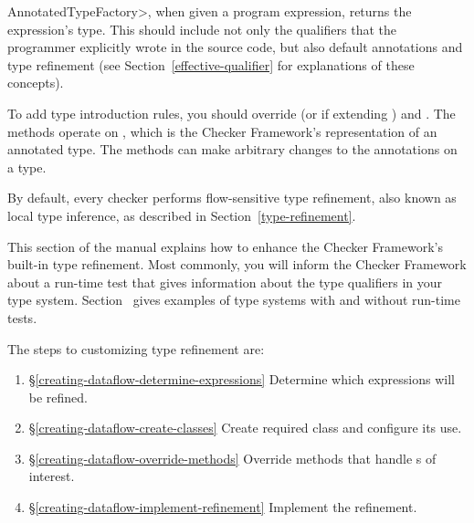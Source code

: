 \<AnnotatedTypeFactory>, when given a program
expression, returns the expression's type.  This should include not only
the qualifiers that the programmer explicitly wrote in the source code, but
also default annotations and type
refinement (see Section~\ref{effective-qualifier} for explanations of these
concepts).

To add type introduction rules, you should override
(or
if extending )
and
.
The methods operate on ,
which is the Checker Framework's representation of an annotated type.
The methods can make arbitrary changes to the annotations on a type.




By default, every checker performs flow-sensitive type refinement, also known as
local type inference, as described
in Section~\ref{type-refinement}.

This section of the manual explains how to enhance the Checker Framework's
built-in type refinement.
Most commonly, you will inform the Checker Framework about a run-time test
that gives information about the type qualifiers in your type system.
Section~ gives examples of
type systems with and without run-time tests.

The steps to customizing type refinement are:
\begin{enumerate}
\item{\S\ref{creating-dataflow-determine-expressions}}
  Determine which expressions will be refined.
\item{\S\ref{creating-dataflow-create-classes}}
  Create required class and configure its use.
\item{\S\ref{creating-dataflow-override-methods}}
  Override methods that handle s of interest.
\item{\S\ref{creating-dataflow-implement-refinement}}
  Implement the refinement.
\end{enumerate}

